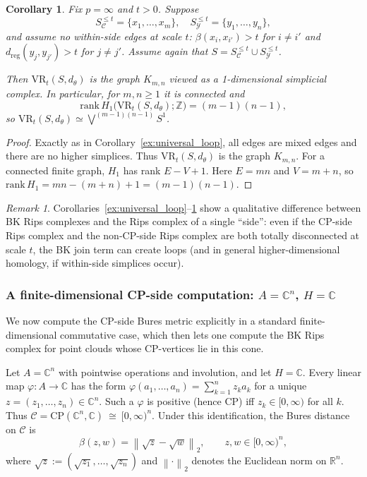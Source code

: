 \documentclass[11pt]{amsart}
\newtheorem{corollary}[theorem]{Corollary}
\theoremstyle{definition}
\theoremstyle{remark}
\newtheorem{remark}[theorem]{Remark}
\newcommand{\R}{\mathbb R}
\newcommand{\Z}{\mathbb Z}
\newcommand{\C}{\mathbb C}
\newcommand{\1}{\mathbbm{1}}
\newcommand{\CP}{\mathrm{CP}}
\newcommand{\norm}[1]{\left\lVert #1\right\rVert}
\newcommand{\VR}{\mathrm{VR}}
\begin{document}
\begin{corollary}
\label{ex:Km n}
Fix $p=\infty$ and $t>0$. Suppose
\[
S_{\mathcal C}^{\le t}=\{x_1,\dots,x_m\},\quad S_{\mathcal Y}^{\le t}=\{y_1,\dots,y_n\},
\]
and assume \emph{no} within-side edges at scale $t$:
$\beta(x_i,x_{i'})>t$ for $i\neq i'$ and $d_{\mathrm{reg}}(y_j,y_{j'})>t$ for $j\neq j'$.
Assume again that $S=S_{\mathcal C}^{\le t}\cup S_{\mathcal Y}^{\le t}$.

Then $\VR_t(S,d_\theta)$ is the graph $K_{m,n}$ viewed as a 1-dimensional simplicial complex.
In particular, for $m,n\ge 1$ it is connected and
\[
\mathrm{rank}\,H_1\bigl(\VR_t(S,d_\theta);\Z\bigr)
=
(m-1)(n-1),
\]
so $\VR_t(S,d_\theta)\simeq \bigvee^{(m-1)(n-1)} S^1$.
\end{corollary}

\begin{proof}
Exactly as in Corollary~\ref{ex:universal_loop}, all edges are mixed edges and there are no higher simplices.
Thus $\VR_t(S,d_\theta)$ is the graph $K_{m,n}$.
For a connected finite graph, $H_1$ has rank $E-V+1$.
Here $E=mn$ and $V=m+n$, so $\mathrm{rank}\,H_1=mn-(m+n)+1=(m-1)(n-1)$.
\end{proof}

\begin{remark}
Corollaries~\ref{ex:universal_loop}--\ref{ex:Km n} show a qualitative difference between BK Rips complexes and the
Rips complex of a single ``side'':
even if the CP-side Rips complex and the non-CP-side Rips complex are both totally disconnected at scale $t$,
the BK join term can create loops (and in general higher-dimensional homology, if within-side simplices occur).
\end{remark}
\subsubsection{A finite-dimensional CP-side computation: $A=\C^n$, $H=\C$}


We now compute the CP-side Bures metric explicitly in a standard finite-dimensional commutative case,
which then lets one compute the BK Rips complex for point clouds whose CP-vertices lie in this cone.

Let $A=\C^n$ with pointwise operations and involution, and let $H=\C$.
Every linear map $\varphi:A\to\C$ has the form $\varphi(a_1,\dots,a_n)=\sum_{k=1}^n z_k a_k$
for a unique $z=(z_1,\dots,z_n)\in\C^n.$
Such a $\varphi$ is positive (hence CP) iff $z_k\in[0,\infty)$ for all $k$.
Thus $\mathcal C=\CP(\C^n,\C)\ \cong\ [0,\infty)^n.$
Under this identification, the Bures distance on $\mathcal C$ is
\begin{equation}\label{eq:hellinger}
\beta(z,w)=\norm{\sqrt{z}-\sqrt{w}}_2,
\qquad z,w\in[0,\infty)^n,
\end{equation}
where $\sqrt{z}:=(\sqrt{z_1},\dots,\sqrt{z_n})$ and $\norm{\cdot}_2$ denotes the Euclidean norm on $\R^n$.
\end{document}
